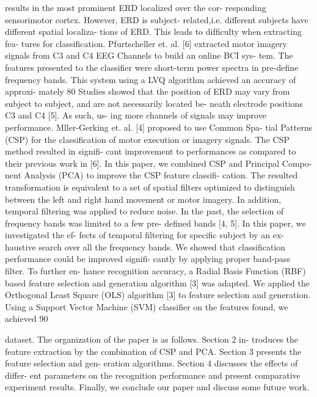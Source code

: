 \documentclass{article}
\begin{document}
results in the most prominent ERD localized over the cor- responding sensorimotor cortex. However, ERD is subject- related,i.e. different subjects have different spatial localiza- tions of ERD. This leads to difﬁculty when extracting fea- tures for classiﬁcation.
Pfurtscheller et. al. [6] extracted motor imagery signals from C3 and C4 EEG Channels to build an online BCI sys- tem. The features presented to the classiﬁer were short-term power spectra in pre-deﬁne frequency bands. This system using a LVQ algorithm achieved an accuracy of approxi- mately 80%
Studies  showed  that  the  position  of  ERD  may  vary from subject to subject, and are not necessarily located be- neath  electrode  positions  C3  and  C4  [5].  As  such,  us- ing more channels of signals may improve performance.
Mller-Gerking et. al. [4] proposed to use Common Spa-
tial Patterns (CSP) for the classiﬁcation of motor execution or imagery  signals. The CSP method resulted in  signiﬁ- cant improvement to performances  as compared to their previous work in  [6].
In this paper, we combined CSP and Principal Compo- nent Analysis (PCA) to improve the CSP feature classiﬁ- cation. The resulted transformation is equivalent to a set of spatial ﬁlters optimized to distinguish between the left and right hand movement or motor imagery. In addition, temporal ﬁltering was applied to reduce noise. In the past, the selection of frequency bands was limited to a few pre- deﬁned bands [4, 5]. In this paper, we investigated the ef- fects of temporal  ﬁltering for  speciﬁc  subject by  an ex- haustive search over all the frequency bands. We showed that classiﬁcation performance could be improved signiﬁ- cantly by applying proper band-pass ﬁlter. To further en- hance recognition accuracy, a Radial Basis Function (RBF) based feature selection and generation algorithm  [3] was adapted. We applied the Orthogonal Least Square (OLS) algorithm [3] to feature selection and generation. Using a Support Vector Machine (SVM) classiﬁer on the features found, we achieved 90%

dataset.
The organization of the paper is as follows. Section 2 in- troduces the feature extraction by the combination of CSP and PCA. Section 3 presents the feature selection and gen- eration algorithms. Section 4 discusses the effects of differ- ent parameters on the recognition performance and present comparative experiment results. Finally, we conclude our paper and discuss some future work.


\section{}
\end{document}
